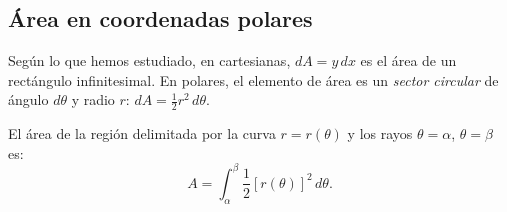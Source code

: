 \subsection{Área en coordenadas polares}

Según lo que hemos estudiado, en cartesianas, $dA = y\,dx$ es el área de un
rectángulo infinitesimal. En polares, el elemento de área es un
\emph{sector circular} de ángulo $d\theta$ y radio $r$:
$dA = \frac{1}{2}r^2\,d\theta$.

\begin{theorem}
El área de la región delimitada por la curva $r = r(\theta)$ y los rayos
$\theta = \alpha$, $\theta = \beta$ es:
\[
  A = \int_{\alpha}^{\beta} \frac{1}{2}[r(\theta)]^2\,d\theta.
\]
\end{theorem}


